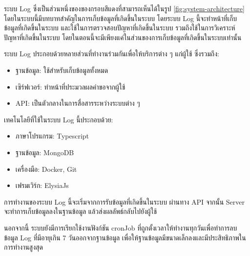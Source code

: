 \ifenglish
\else
ระบบ Log ซึ่งเป็นส่วนหนึ่งของของกรอบสีแดงที่สามารถเห็นได้ในรูป \ref{fig:system-architecture} โดยในระบบนี้มีบทบาทสำคัญในการเก็บข้อมูลที่เกิดขึ้นในระบบ โดยระบบ Log นี้จะทำหน้าที่เก็บข้อมูลที่เกิดขึ้นในระบบ และใช้ในการตรวจสอบปัญหาที่เกิดขึ้นในระบบ รวมถึงใช้ในการวิเคราะห์ปัญหาที่เกิดขึ้นในระบบ โดยในตอนนี้จะมีเพียงแค่ในส่วนของการเก็บข้อมูลที่เกิดขึ้นในระบบเท่านั้น

ระบบ Log ประกอบด้วยหลายส่วนที่ทำงานร่วมกันเพื่อให้บริการต่าง ๆ แก่ผู้ใช้ ซึ่งรวมถึง:
\begin{itemize}
    \item ฐานข้อมูล: ใช้สำหรับเก็บข้อมูลทั้งหมด
    \item เซิร์ฟเวอร์: ทำหน้าที่ประมวลผลคำขอจากผู้ใช้
    \item API: เป็นตัวกลางในการสื่อสารระหว่างระบบต่าง ๆ
\end{itemize}

เทคโนโลยีที่ใช้ในระบบ Log นี้ประกอบด้วย:
\begin{itemize}
    \item ภาษาโปรแกรม: Typescript
    \item ฐานข้อมูล: MongoDB \cite{mongodb}
    \item เครื่องมือ: Docker, Git
    \item เฟรมเวิร์ก: ElysiaJs
\end{itemize}

การทำงานของระบบ Log นี้จะเริ่มจากการรับข้อมูลที่เกิดขึ้นในระบบ ผ่านทาง API จากนั้น Server จะทำการเก็บข้อมูลลงในฐานข้อมูล แล้วส่งผลลัพธ์กลับไปยังผู้ใช้

นอกจากนี้ ระบบยังมีการเรียกใช้งานฟังก์ชัน cronJob ที่ถูกตั้งเวลาให้ทำงานทุกวันเพื่อทำการลบข้อมูล Log ที่มีอายุเกิน 7 วันออกจากฐานข้อมูล เพื่อให้ฐานข้อมูลมีขนาดเล็กลงและมีประสิทธิภาพในการทำงานสูงสุด
\fi